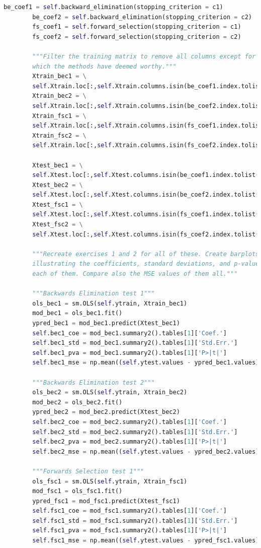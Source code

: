 \documentclass[]{article}
\begin{document}
\begin{lstlisting}[language=Python]
		be_coef1 = self.backward_elimination(stopping_criterion = c1)
		be_coef2 = self.backward_elimination(stopping_criterion = c2)
		fs_coef1 = self.forward_selection(stopping_criterion = c1)
		fs_coef2 = self.forward_selection(stopping_criterion = c2)
		
		"""Filter the training matrix to remove all columns except for the ones
		which the methods have deemed worthy."""
		Xtrain_bec1 = \
		self.Xtrain.loc[:,self.Xtrain.columns.isin(be_coef1.index.tolist())]
		Xtrain_bec2 = \
		self.Xtrain.loc[:,self.Xtrain.columns.isin(be_coef2.index.tolist())]
		Xtrain_fsc1 = \
		self.Xtrain.loc[:,self.Xtrain.columns.isin(fs_coef1.index.tolist())]
		Xtrain_fsc2 = \
		self.Xtrain.loc[:,self.Xtrain.columns.isin(fs_coef2.index.tolist())]
		
		Xtest_bec1 = \
		self.Xtest.loc[:,self.Xtest.columns.isin(be_coef1.index.tolist())]
		Xtest_bec2 = \
		self.Xtest.loc[:,self.Xtest.columns.isin(be_coef2.index.tolist())]
		Xtest_fsc1 = \
		self.Xtest.loc[:,self.Xtest.columns.isin(fs_coef1.index.tolist())]
		Xtest_fsc2 = \
		self.Xtest.loc[:,self.Xtest.columns.isin(fs_coef2.index.tolist())]
		
		"""Recreate exercises 1 and 2 for all of these. Create barplots
		illustrating the coefficients, standard deviations, and p-values for
		each of them. Compare also the MSE values of them all."""
		
		"""Backwards Elimination test 1"""
		ols_bec1 = sm.OLS(self.ytrain, Xtrain_bec1)
		mod_bec1 = ols_bec1.fit()
		ypred_bec1 = mod_bec1.predict(Xtest_bec1)
		self.bec1_coe = mod_bec1.summary2().tables[1]['Coef.']
		self.bec1_std = mod_bec1.summary2().tables[1]['Std.Err.']
		self.bec1_pva = mod_bec1.summary2().tables[1]['P>|t|']
		self.bec1_mse = np.mean((self.ytest.values - ypred_bec1.values)**2)
		
		"""Backwards Elimination test 2"""
		ols_bec2 = sm.OLS(self.ytrain, Xtrain_bec2)
		mod_bec2 = ols_bec2.fit()
		ypred_bec2 = mod_bec2.predict(Xtest_bec2)
		self.bec2_coe = mod_bec2.summary2().tables[1]['Coef.']
		self.bec2_std = mod_bec2.summary2().tables[1]['Std.Err.']
		self.bec2_pva = mod_bec2.summary2().tables[1]['P>|t|']
		self.bec2_mse = np.mean((self.ytest.values - ypred_bec2.values)**2)
		
		"""Forwards Selection test 1"""
		ols_fsc1 = sm.OLS(self.ytrain, Xtrain_fsc1)
		mod_fsc1 = ols_fsc1.fit()
		ypred_fsc1 = mod_fsc1.predict(Xtest_fsc1)
		self.fsc1_coe = mod_fsc1.summary2().tables[1]['Coef.']
		self.fsc1_std = mod_fsc1.summary2().tables[1]['Std.Err.']
		self.fsc1_pva = mod_fsc1.summary2().tables[1]['P>|t|']
		self.fsc1_mse = np.mean((self.ytest.values - ypred_fsc1.values)**2)
		

\end{lstlisting}
\end{document}
